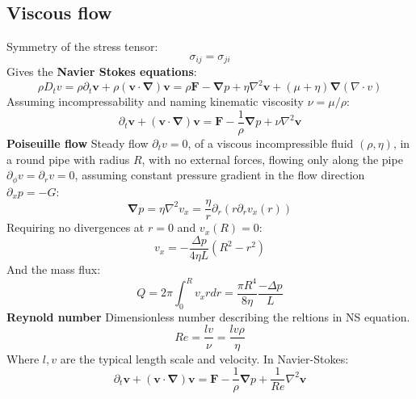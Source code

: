 \documentclass[twocolumn]{article}
\begin{document}
\subsection{Viscous flow}
Symmetry of the stress tensor:
\begin{equation}
    \sigma_{ij} = \sigma_{ji}
\end{equation}
Gives the \textbf{Navier Stokes equations}:
\begin{equation}
    \rho D_t v = \rho \partial_t \boldsymbol{v} + \rho(\boldsymbol{v}\cdot\boldsymbol{\nabla})\boldsymbol{v} = \rho \boldsymbol{F} - \boldsymbol{\nabla}p + \eta \nabla^2 \boldsymbol{v} + (\mu + \eta)\boldsymbol{\nabla}(\nabla\cdot v)
\end{equation}
Assuming incompressability and naming kinematic viscosity $\nu = \mu/\rho$:
\begin{equation}
    \partial_t \boldsymbol{v} + (\boldsymbol{v}\cdot\boldsymbol{\nabla})\boldsymbol{v} = \boldsymbol{F} - \frac{1}{\rho}\boldsymbol{\nabla}p + \nu \nabla^2 \boldsymbol{v}
\end{equation}
\textbf{Poiseuille flow}
\newline
Steady flow $\partial_t v = 0$, of a viscous incompressible fluid $(\rho, \eta)$, in a round pipe with radius $R$, with no external forces, flowing only along the pipe $\partial_\phi v = \partial_r v = 0$, assuming constant pressure gradient in the flow direction $\partial_x p = -G$:
\begin{equation}
    \boldsymbol{\nabla}p = \eta \nabla^2 v_x = \frac{\eta}{r}\partial_r(r\partial_r v_x(r))
\end{equation}
Requiring no divergences at $r = 0$ and $v_x(R) = 0$:
\begin{equation}
    v_x = -\frac{\Delta p}{4\eta L}\left(R^2 - r^2\right)
\end{equation}
And the mass flux:
\begin{equation}
    Q = 2\pi \int_0^R v_x rdr = \frac{\pi R^4}{8\eta}\frac{-\Delta p}{L}
\end{equation}
\textbf{Reynold number}
\newline
Dimensionless number describing the reltions in NS equation.
\begin{equation}
    Re = \frac{lv}{\nu} = \frac{lv\rho}{\eta}
\end{equation}
Where $l, v$ are the typical length scale and velocity.
In Navier-Stokes:
\begin{equation}
    \partial_t \boldsymbol{v} + (\boldsymbol{v}\cdot\boldsymbol{\nabla})\boldsymbol{v} = \boldsymbol{F} - \frac{1}{\rho}\boldsymbol{\nabla}p + \frac{1}{Re} \nabla^2 \boldsymbol{v}
\end{equation}
\end{document}
